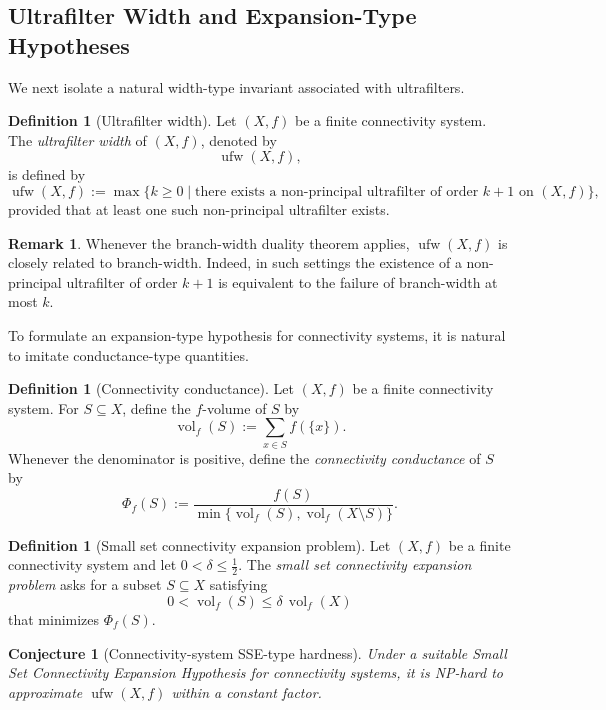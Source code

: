 \documentclass[10pt]{book}
\newtheorem{conjecture}[theorem]{Conjecture}
\theoremstyle{definition}
\newtheorem{remark}[theorem]{Remark}
\newtheorem{definition}[theorem]{Definition}
\begin{document}
\subsection{Ultrafilter Width and Expansion-Type Hypotheses}
We next isolate a natural width-type invariant associated with ultrafilters.

\begin{definition}[Ultrafilter width]
Let \((X,f)\) be a finite connectivity system.
The \emph{ultrafilter width} of \((X,f)\), denoted by
\[
\operatorname{ufw}(X,f),
\]
is defined by
\[
\operatorname{ufw}(X,f):=
\max\{k\ge 0 \mid \text{there exists a non-principal ultrafilter of order } k+1 \text{ on } (X,f)\},
\]
provided that at least one such non-principal ultrafilter exists.
\end{definition}

\begin{remark}
Whenever the branch-width duality theorem applies, \(\operatorname{ufw}(X,f)\) is closely related to branch-width.
Indeed, in such settings the existence of a non-principal ultrafilter of order \(k+1\) is equivalent to the failure of branch-width at most \(k\).
\end{remark}

To formulate an expansion-type hypothesis for connectivity systems, it is natural to imitate conductance-type quantities.

\begin{definition}[Connectivity conductance]
Let \((X,f)\) be a finite connectivity system.
For \(S\subseteq X\), define the \(f\)-volume of \(S\) by
\[
\operatorname{vol}_f(S):=\sum_{x\in S} f(\{x\}).
\]
Whenever the denominator is positive, define the \emph{connectivity conductance} of \(S\) by
\[
\Phi_f(S):=
\frac{f(S)}{\min\{\operatorname{vol}_f(S),\operatorname{vol}_f(X\setminus S)\}}.
\]
\end{definition}

\begin{definition}[Small set connectivity expansion problem]
Let \((X,f)\) be a finite connectivity system and let \(0<\delta\le \tfrac12\).
The \emph{small set connectivity expansion problem} asks for a subset \(S\subseteq X\) satisfying
\[
0<\operatorname{vol}_f(S)\le \delta\,\operatorname{vol}_f(X)
\]
that minimizes \(\Phi_f(S)\).
\end{definition}

\begin{conjecture}[Connectivity-system SSE-type hardness]
Under a suitable Small Set Connectivity Expansion Hypothesis for connectivity systems, it is NP-hard to approximate \(\operatorname{ufw}(X,f)\) within a constant factor.
\end{conjecture}
\end{document}

